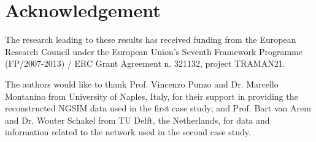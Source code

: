 \documentclass[titlepage,oneside,fleqn,12pt]{article}
\begin{document}
\section*{Acknowledgement}
The research leading to these results has received funding from the European Research Council under the European Union's Seventh Framework Programme (FP/2007-2013) / ERC Grant Agreement n. 321132, project TRAMAN21.

The authors would like to thank Prof. Vincenzo Punzo and Dr. Marcello Montanino from University of Naples, Italy, for their support in providing the reconstructed  NGSIM data used in the first case study; and Prof. Bart van Arem and Dr. Wouter Schakel from TU Delft, the Netherlands, for data and information related to the network used in the second case study.

\clearpage



\end{document}
